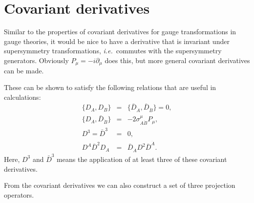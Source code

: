 \documentclass[notes.tex]{subfiles}
\begin{document}
\section{Covariant derivatives}
\label{sec:covder}
Similar to the properties of covariant derivatives for gauge transformations in gauge theories, it would be nice to have a derivative that is invariant under supersymmetry transformations, {\it i.e.}\ commutes with the supersymmetry generators. Obviously $P_\mu = -i\partial_\mu$ does this, but more general covariant derivatives can be made.

These can be shown to satisfy the following relations that are useful in calculations:
\begin{eqnarray}
\{D_A, D_B\} &=& \{\bar{D}_{\dot{A}}, \bar{D}_{\dot{B}}\} = 0,\\
\{D_A, \bar{D}_{\dot{B}}\} &=& -2\sigma^\mu_{A\dot{B}}P_\mu, \label{eq:D2}\\
D^3 = \bar{D}^3&=&0 \label{eq:D3}, \\
D^A\bar{D}^2 D_A &=& \bar{D}_{\dot{A}}D^2\bar{D}^{\dot{A}}.
\end{eqnarray}
Here, $D^3$ and $\bar D^3$ means the application of at least three of these covariant derivatives.

From the covariant derivatives we can also construct  a set of three projection operators.
\end{document}
